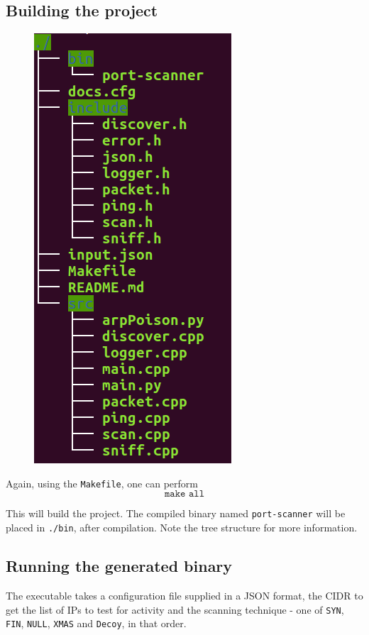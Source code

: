 \documentclass[12pt]{article}
\newcommand{\pbreak}{\vspace{4mm}}
\begin{document}
\subsection{Building the project}
\begin{minipage}{0.475\linewidth}
\begin{figure}[H]
\centering
\includegraphics[width=0.6\linewidth]{file-structure-1.png}
\end{figure}
\end{minipage}
\hfill
\begin{minipage}{0.475\linewidth}
Again, using the \texttt{Makefile}, one can perform
\[\texttt{make all}\]

This will build the project. The compiled binary named \texttt{port-scanner} will be placed in \texttt{./bin}, after compilation. Note the tree structure for more information.
\end{minipage}

\subsection{Running the generated binary}
The executable takes a configuration file supplied in a JSON format, the CIDR to get the list of IPs to test for activity and the scanning technique - one of \texttt{SYN}, \texttt{FIN}, \texttt{NULL}, \texttt{XMAS} and \texttt{Decoy}, in that order.
\pbreak
\end{document}
